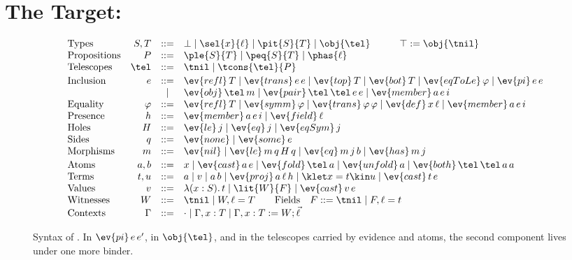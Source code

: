 \section{The Target: \FCdot}\label{sec:target}

\begin{figure}
\small
\[
\begin{array}{@{}lrcl@{}}
\text{Types} & S,T & ::= & \bot \mid \sel{x}{\ell} \mid \pit{S}{T} \mid \obj{\tel} \qquad\quad \top \mathrel{:=} \obj{\tnil} \\
\text{Propositions} & P & ::= & \ple{S}{T} \mid \peq{S}{T} \mid \phas{\ell} \\
\text{Telescopes} & \tel & ::= & \tnil \mid \tcons{\tel}{P} \\[2pt]
\text{Inclusion} & e & ::= & \ev{refl}\,T \mid \ev{trans}\,e\,e \mid \ev{top}\,T \mid \ev{bot}\,T \mid \ev{eqToLe}\,\varphi \mid \ev{pi}\,e\,e \\
& & \mid & \ev{obj}\,\tel\,m \mid \ev{pair}\,\tel\,\tel\,e\,e \mid \ev{member}\,a\,e\,i \\
\text{Equality} & \varphi & ::= & \ev{refl}\,T \mid \ev{symm}\,\varphi \mid \ev{trans}\,\varphi\,\varphi \mid \ev{def}\,x\,\ell \mid \ev{member}\,a\,e\,i \\
\text{Presence} & h & ::= & \ev{member}\,a\,e\,i \mid \ev{field}\,\ell \\
\text{Holes} & H & ::= & \ev{le}\,j \mid \ev{eq}\,j \mid \ev{eqSym}\,j \\
\text{Sides} & q & ::= & \ev{none} \mid \ev{some}\,e \\
\text{Morphisms} & m & ::= & \ev{nil} \mid \ev{le}\,m\,q\,H\,q \mid \ev{eq}\,m\,j\,b \mid \ev{has}\,m\,j \\[2pt]
\text{Atoms} & a,b & ::= & x \mid \ev{cast}\,a\,e \mid \ev{fold}\,\tel\,a \mid \ev{unfold}\,a \mid \ev{both}\,\tel\,\tel\,a\,a \\
\text{Terms} & t,u & ::= & a \mid v \mid a\,b \mid \ev{proj}\,a\,\ell\,h \mid \klet x = t \kin u \mid \ev{cast}\,t\,e \\
\text{Values} & v & ::= & \lambda(x : S).\,t \mid \lit{W}{F} \mid \ev{cast}\,v\,e \\
\text{Witnesses} & W & ::= & \tnil \mid W, \ell = T \qquad \text{Fields} \quad F ::= \tnil \mid F, \ell = t \\
\text{Contexts} & \Gamma & ::= & \cdot \mid \Gamma, x : T \mid \Gamma, x : T \mathrel{:=} W ; \vec{\ell}
\end{array}
\]
\caption{Syntax of \FCdot. In $\ev{pi}\,e\,e'$, in $\obj{\tel}$, and in the telescopes carried by evidence and atoms, the second component lives under one more binder.}
\label{fig:target-syntax}
\end{figure}


